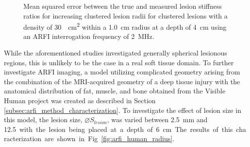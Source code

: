 			\begin{figure}[!htb]
				\centering
				\caption[ARFI imaging-acquired lesion stiffness mean squared error related to small lesion cluster density]{Mean squared error between the true and measured lesion stiffness ratios for increasing clustered lesion radii for clustered lesions with a density of \SI{30}{\per\cm\squared} within a \SI{1.0}{cm} radius at a depth of \SI{4}{\cm} using an ARFI interrogation frequency of \SI{2}{\MHz}.}
				\label{fig:arfi_cluster_radius_mse}
			\end{figure}

			While the aforementioned studies investigated generally spherical lesionous regions, this is unlikely to be the case in a real soft tissue domain. To further investigate ARFI imaging, a model utilizing complicated geometry arising from the combination of the MRI-acquired geometry of a deep tissue injury with the anatomical distribution of fat, muscle, and bone obtained from the Visible Human project \cite{visiblehuman} was created as described in Section \ref{subsec:arfi_method_characterization}. To investigate the effect of lesion size in this model, the lesion size, $\diameter S_{lesion}$, was varied between \SI{2.5}{\mm} and \SI{12.5} with the lesion being placed at a depth of \SI{6}{\cm}. The results of this characterization are shown in Fig. \ref{fig:arfi_human_radius}.

